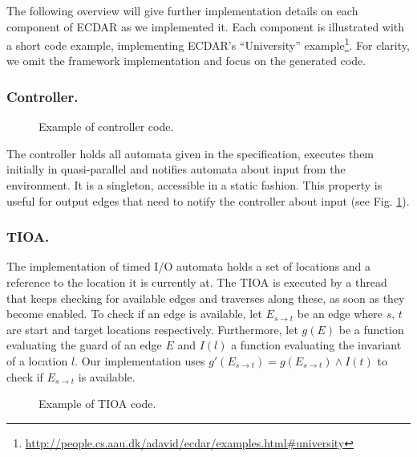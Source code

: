 The following overview will give further implementation details on each
component of ECDAR as we implemented it. Each component is illustrated with a
short code example, implementing ECDAR's ``University''
example\footnote{\url{http://people.cs.aau.dk/adavid/ecdar/examples.html#university}}. For
clarity, we omit the framework implementation and focus on the generated code.

\subsubsection{Controller.}

\begin{figure}[t]

\caption{Example of controller code.}
\label{controller-example}
\end{figure}

The controller holds all automata given in the specification, executes
them initially in quasi-parallel and notifies automata about input
from the environment. It is a singleton, accessible in a static fashion.
This property is useful for output edges that need to notify
the controller about input (see Fig. \ref{controller-example}).

\subsubsection{TIOA.}

The implementation of timed I/O automata holds a set of locations
and a reference to the location it is currently at. The TIOA is executed
by a thread that keeps checking for available edges and traverses
along these, as soon as they become enabled. To check if an edge is
available, let $E_{s\rightarrow t}$ be an edge where $s,\, t$ are
start and target locations respectively. Furthermore, let $g(E)$
be a function evaluating the guard of an edge $E$ and $I(l)$ a function
evaluating the invariant of a location $l$. Our implementation uses
$g'(E_{s\rightarrow t})=g(E_{s\rightarrow t})\wedge I(t)$ to check
if $E_{s\rightarrow t}$ is available.

\begin{figure}[t]

\caption{Example of TIOA code.}
\label{tioa-example}
\end{figure}

